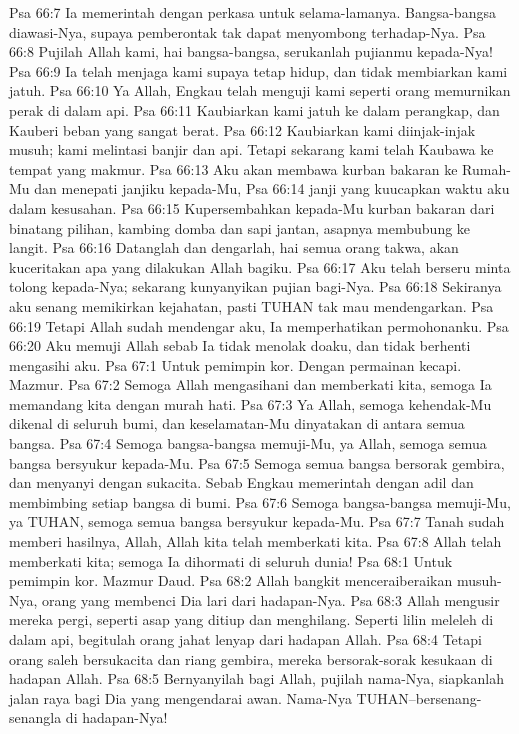 Psa 66:7  Ia memerintah dengan perkasa untuk selama-lamanya. Bangsa-bangsa diawasi-Nya, supaya pemberontak tak dapat menyombong terhadap-Nya.
Psa 66:8  Pujilah Allah kami, hai bangsa-bangsa, serukanlah pujianmu kepada-Nya!
Psa 66:9  Ia telah menjaga kami supaya tetap hidup, dan tidak membiarkan kami jatuh.
Psa 66:10  Ya Allah, Engkau telah menguji kami seperti orang memurnikan perak di dalam api.
Psa 66:11  Kaubiarkan kami jatuh ke dalam perangkap, dan Kauberi beban yang sangat berat.
Psa 66:12  Kaubiarkan kami diinjak-injak musuh; kami melintasi banjir dan api. Tetapi sekarang kami telah Kaubawa ke tempat yang makmur.
Psa 66:13  Aku akan membawa kurban bakaran ke Rumah-Mu dan menepati janjiku kepada-Mu,
Psa 66:14  janji yang kuucapkan waktu aku dalam kesusahan.
Psa 66:15  Kupersembahkan kepada-Mu kurban bakaran dari binatang pilihan, kambing domba dan sapi jantan, asapnya membubung ke langit.
Psa 66:16  Datanglah dan dengarlah, hai semua orang takwa, akan kuceritakan apa yang dilakukan Allah bagiku.
Psa 66:17  Aku telah berseru minta tolong kepada-Nya; sekarang kunyanyikan pujian bagi-Nya.
Psa 66:18  Sekiranya aku senang memikirkan kejahatan, pasti TUHAN tak mau mendengarkan.
Psa 66:19  Tetapi Allah sudah mendengar aku, Ia memperhatikan permohonanku.
Psa 66:20  Aku memuji Allah sebab Ia tidak menolak doaku, dan tidak berhenti mengasihi aku.
Psa 67:1  Untuk pemimpin kor. Dengan permainan kecapi. Mazmur.
Psa 67:2  Semoga Allah mengasihani dan memberkati kita, semoga Ia memandang kita dengan murah hati.
Psa 67:3  Ya Allah, semoga kehendak-Mu dikenal di seluruh bumi, dan keselamatan-Mu dinyatakan di antara semua bangsa.
Psa 67:4  Semoga bangsa-bangsa memuji-Mu, ya Allah, semoga semua bangsa bersyukur kepada-Mu.
Psa 67:5  Semoga semua bangsa bersorak gembira, dan menyanyi dengan sukacita. Sebab Engkau memerintah dengan adil dan membimbing setiap bangsa di bumi.
Psa 67:6  Semoga bangsa-bangsa memuji-Mu, ya TUHAN, semoga semua bangsa bersyukur kepada-Mu.
Psa 67:7  Tanah sudah memberi hasilnya, Allah, Allah kita telah memberkati kita.
Psa 67:8  Allah telah memberkati kita; semoga Ia dihormati di seluruh dunia!
Psa 68:1  Untuk pemimpin kor. Mazmur Daud.
Psa 68:2  Allah bangkit menceraiberaikan musuh-Nya, orang yang membenci Dia lari dari hadapan-Nya.
Psa 68:3  Allah mengusir mereka pergi, seperti asap yang ditiup dan menghilang. Seperti lilin meleleh di dalam api, begitulah orang jahat lenyap dari hadapan Allah.
Psa 68:4  Tetapi orang saleh bersukacita dan riang gembira, mereka bersorak-sorak kesukaan di hadapan Allah.
Psa 68:5  Bernyanyilah bagi Allah, pujilah nama-Nya, siapkanlah jalan raya bagi Dia yang mengendarai awan. Nama-Nya TUHAN--bersenang-senangla di hadapan-Nya!

